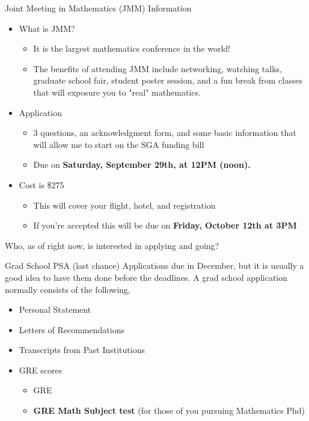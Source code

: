 \documentclass[xcolor=dvipsnames]{beamer}
\begin{document}
\begin{frame}{Joint Meeting in Mathematics (JMM) Information} 

\begin{itemize}
\item What is JMM? 
\begin{itemize}
\item It is the largest mathematics conference in the world!
\item The benefits of attending JMM include networking, watching talks, graduate school fair, student poster session, and a fun break from classes that will exposure you to "real" mathematics.
\end{itemize}
\item Application
\begin{itemize}
\item 3 questions, an acknowledgment form, and some basic information that will allow me to start on the SGA funding bill
\item Due on \textbf{Saturday, September 29th, at 12PM (noon).} 
\end{itemize}
\item Cost is \$275
\begin{itemize}
\item  This will cover your flight, hotel, and registration
\item If you're accepted this will be due on \textbf{Friday, October 12th at 3PM}
\end{itemize}
\end{itemize}

\vfill
Who, as of right now, is interested in applying and going? 
\end{frame}

\begin{frame}{Grad School PSA (last chance)}
Applications due in December, but it is usually a good idea to have them done before the deadlines. A grad school application normally consists of the following, 
\begin{itemize}
\item Personal Statement
\item Letters of Recommendations
\item Transcripts from Past Institutions
\item GRE scores
\begin{itemize}
\item GRE 
\item \textbf{GRE Math Subject test }(for those of you pursuing Mathematics Phd) 

\end{itemize}
\end{itemize}
\end{frame}
\end{document}
